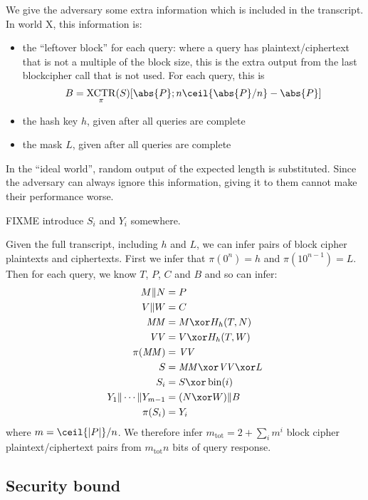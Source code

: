 \documentclass[letterpaper,11pt]{article}
\newcommand*{\Concat}{\Vert}
\newcommand*{\MM}{\mathit{MM}}
\newcommand*{\mtot}{m_{\mathrm{tot}}}
\newcommand*{\VV}{\mathit{VV}}
\DeclareMathOperator{\fromint}{bin}
\DeclareMathOperator{\XCTR}{XCTR}
\begin{document}
We give the adversary some 
extra information
which is included in the transcript.
In world X, this information is:
\begin{itemize}
    \item the ``leftover block'' for each query:
    where a query has plaintext/ciphertext
    that is not a multiple of the block size,
    this is the extra output from the last
    blockcipher call that is not used.
    For each query, this is 
    \begin{displaymath}
        B = \XCTR_\pi(S)[\abs{P}; n\ceil{\abs{P}/n}-\abs{P}]
    \end{displaymath}
    \item the hash key \(h\), given after all queries are complete
    \item the mask \(L\), given after all queries are complete
\end{itemize}
In the ``ideal world'', random output of the expected
length is substituted. Since the adversary can always ignore
this information, giving it to them cannot make their performance worse.

FIXME introduce \(S_i\) and \(Y_i\) somewhere.

Given the full transcript, including \(h\) and \(L\),
we can infer pairs of block cipher plaintexts and ciphertexts.
First we infer that \(\pi(0^n) = h\) and \(\pi(10^{n-1}) = L\).
Then for each query, we know \(T\), \(P\), \(C\) and \(B\)
and so can infer:
\begin{align*}
    M \Concat N &= P \\
    V \Concat W &= C \\
    \MM &= M \xor H_h(T, N)\\
    \VV &= V \xor H_h(T, W)\\
    \pi(\MM) &= \VV\\
    S &= \MM \xor \VV \xor L\\ 
    S_i &= S \xor \fromint(i)\\
    Y_1 \Concat \cdots \Concat Y_{m-1} &= (N \xor W) \Concat B \\
    \pi(S_i) &= Y_i \\
\end{align*}
where \(m = \ceil{|P|}/n\).  We therefore infer \(\mtot = 2 + \sum_i m^i \) block cipher
plaintext/ciphertext pairs from \(\mtot n\) bits of query response.




\subsection{Security bound}
\end{document}
